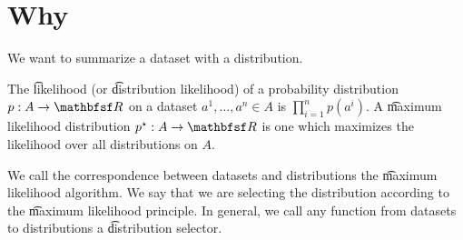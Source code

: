 

\section*{Why}

We want to summarize a dataset with a distribution.


The \t{likelihood} (or \t{distribution likelihood}) of a probability distribution $p: A \to \R $ on a dataset $a^1, \dots , a^n \in A$ is $\prod_{i = 1}^{n} p(a^i)$.
A \t{maximum likelihood distribution} $p^\star: A \to \R $ is one which maximizes the likelihood over all distributions on $A$.

We call the correspondence between datasets and distributions the \t{maximum likelihood algorithm}.
We say that we are selecting the distribution according to the \t{maximum likelihood principle}.
In general, we call any function from datasets to distributions a \t{distribution selector}.

\blankpage
